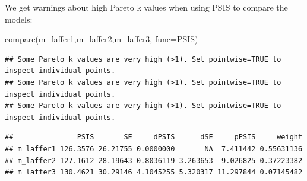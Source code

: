 \documentclass[
]{book}
\newenvironment{Shaded}{\begin{snugshade}}{\end{snugshade}}
\newcommand{\AttributeTok}[1]{\textcolor[rgb]{0.77,0.63,0.00}{#1}}
\newcommand{\ConstantTok}[1]{\textcolor[rgb]{0.00,0.00,0.00}{#1}}
\newcommand{\DecValTok}[1]{\textcolor[rgb]{0.00,0.00,0.81}{#1}}
\newcommand{\FloatTok}[1]{\textcolor[rgb]{0.00,0.00,0.81}{#1}}
\newcommand{\FunctionTok}[1]{\textcolor[rgb]{0.00,0.00,0.00}{#1}}
\newcommand{\NormalTok}[1]{#1}
\newcommand{\OtherTok}[1]{\textcolor[rgb]{0.56,0.35,0.01}{#1}}
\newcommand{\SpecialCharTok}[1]{\textcolor[rgb]{0.00,0.00,0.00}{#1}}
\newcommand{\StringTok}[1]{\textcolor[rgb]{0.31,0.60,0.02}{#1}}
\begin{document}
We get warnings about high Pareto k values when using PSIS to compare the models:

\begin{Shaded}
\begin{Highlighting}[]
\FunctionTok{compare}\NormalTok{(m\_laffer1,m\_laffer2,m\_laffer3, }\AttributeTok{func=}\NormalTok{PSIS)}
\end{Highlighting}
\end{Shaded}

\begin{verbatim}
## Some Pareto k values are very high (>1). Set pointwise=TRUE to inspect individual points.
## Some Pareto k values are very high (>1). Set pointwise=TRUE to inspect individual points.
## Some Pareto k values are very high (>1). Set pointwise=TRUE to inspect individual points.
\end{verbatim}

\begin{verbatim}
##               PSIS       SE     dPSIS      dSE     pPSIS     weight
## m_laffer1 126.3576 26.21755 0.0000000       NA  7.411442 0.55631136
## m_laffer2 127.1612 28.19643 0.8036119 3.263653  9.026825 0.37223382
## m_laffer3 130.4621 30.29146 4.1045255 5.320317 11.297844 0.07145482
\end{verbatim}

\begin{Shaded}
\end{Shaded}
\end{document}
